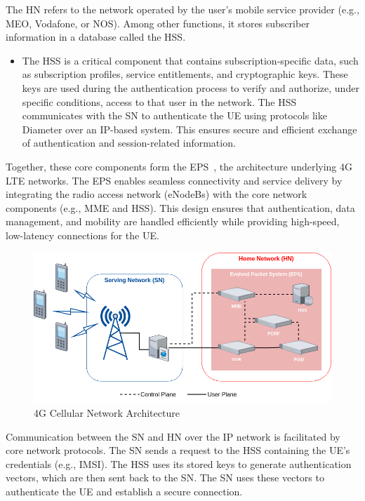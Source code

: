 The \ac{HN} refers to the network operated by the user's mobile service provider (e.g., MEO, Vodafone, or NOS). Among other functions, it stores subscriber information in a database called the \ac{HSS}.

\begin{itemize}
    \item {
        The \ac{HSS} is a critical component that contains subscription-specific data, such as subscription profiles, service entitlements, and cryptographic keys. These keys are used during the authentication process to verify and authorize, under specific conditions, access to that user in the network. The \ac{HSS} communicates with the \ac{SN} to authenticate the \ac{UE} using protocols like Diameter over an IP-based system. This ensures secure and efficient exchange of authentication and session-related information.
    }
\end{itemize}

Together, these core components form the \ac{EPS}~\cite{cbl-comp-p3}, the architecture underlying \ac{4G} \ac{LTE} networks. The \ac{EPS} enables seamless connectivity and service delivery by integrating the radio access network (\acp{eNodeB}) with the core network components (e.g., \ac{MME} and \ac{HSS}). This design ensures that authentication, data management, and mobility are handled efficiently while providing high-speed, low-latency connections for the \ac{UE}.

\begin{figure}
    \centering
    \includegraphics[width=0.75\linewidth]{figs/4G Cellular Network Architecture.png}
    \caption{\ac{4G} Cellular Network Architecture}
    \label{fig:4G Cellular Network Architecture}
\end{figure}

Communication between the \ac{SN} and \ac{HN} over the IP network is facilitated by core network protocols. The \ac{SN} sends a request to the \ac{HSS} containing the \ac{UE}’s credentials (e.g., \ac{IMSI}). The \ac{HSS} uses its stored keys to generate authentication vectors, which are then sent back to the \ac{SN}. The \ac{SN} uses these vectors to authenticate the \ac{UE} and establish a secure connection.

